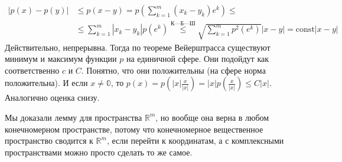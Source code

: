 \documentclass{article}
\begin{document}
\begin{itemize}
\begin{Proof}
            \[
            \begin{split}
                |p(x)-p(y)|&\leqslant p(x-y)=p\left(\sum\limits_{k=1}^m(x_k-y_k)e^k\right)\leqslant\\
                &\leqslant\sum\limits_{k=1}^m|x_k-y_k|p(e^k)\overset{\text{К---Б---Ш}}\leqslant\sqrt{\sum\limits_{k=1}^mp^2(e^k)}|x-y|=\mathrm{const}|x-y|
            \end{split}
            \]
            Действительно, непрерывна. Тогда по теореме Вейерштрасса существуют минимум и максимум функции $p$ на единичной сфере. Они подойдут как соответственно $c$ и $C$. Понятно, что они положительны (на сфере норма положительна). И если $x\neq\mathbb0$, то $p(x)=p\left(|x|\frac x{|x|}\right)=|x|p\left(\frac x{|x|}\right)\leqslant C|x|$. Аналогично оценка снизу.
        \end{Proof}
        \begin{Comment}
            Мы доказали лемму для пространства $\mathbb R^m$, но вообще она верна в любом конечномерном пространстве, потому что конечномерное вещественное пространство сводится к $\mathbb R^m$, если перейти к координатам, а с комплексными пространствами можно просто сделать то же самое.
        \end{Comment}
    \end{itemize}
\end{document}
